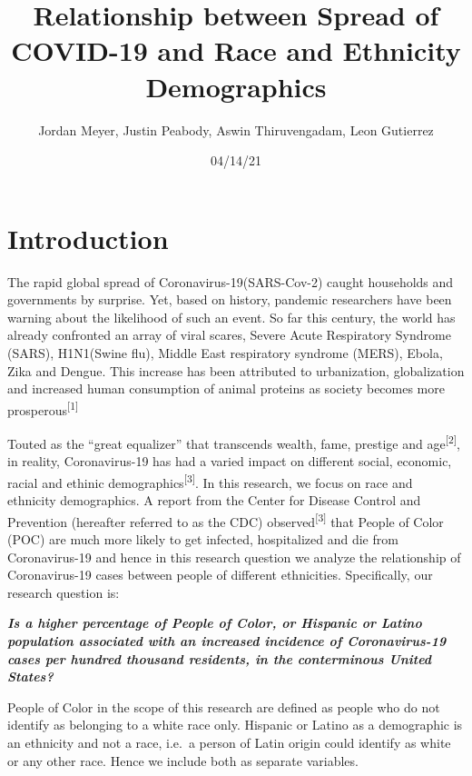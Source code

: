 \documentclass[
]{article}
\title{Relationship between Spread of COVID-19 and Race and Ethnicity
Demographics}
\author{Jordan Meyer, Justin Peabody, Aswin Thiruvengadam, Leon Gutierrez}
\date{04/14/21}
\begin{document}
\maketitle

{
\setcounter{tocdepth}{2}
\tableofcontents
}
\newpage

\newpage
\setlength{\headsep}{1cm}
\maketitle

\newpage
\setlength{\headsep}{1cm}

\section{Introduction}

The rapid global spread of Coronavirus-19(SARS-Cov-2) caught households
and governments by surprise. Yet, based on history, pandemic researchers
have been warning about the likelihood of such an event. So far this
century, the world has already confronted an array of viral scares,
Severe Acute Respiratory Syndrome (SARS), H1N1(Swine flu), Middle East
respiratory syndrome (MERS), Ebola, Zika and Dengue. This increase has
been attributed to urbanization, globalization and increased human
consumption of animal proteins as society becomes more
prosperous\textsuperscript{{[}1{]}}

Touted as the ``great equalizer'' that transcends wealth, fame, prestige
and age\textsuperscript{{[}2{]}}, in reality, Coronavirus-19 has had a
varied impact on different social, economic, racial and ethinic
demographics\textsuperscript{{[}3{]}}. In this research, we focus on
race and ethnicity demographics. A report from the Center for Disease
Control and Prevention (hereafter referred to as the CDC)
observed\textsuperscript{{[}3{]}} that People of Color (POC) are much
more likely to get infected, hospitalized and die from Coronavirus-19
and hence in this research question we analyze the relationship of
Coronavirus-19 cases between people of different ethnicities.
Specifically, our research question is:

\textbf{\emph{Is a higher percentage of People of Color, or Hispanic or
Latino population associated with an increased incidence of
Coronavirus-19 cases per hundred thousand residents, in the conterminous
United States?}}

People of Color in the scope of this research are defined as people who
do not identify as belonging to a white race only. Hispanic or Latino as
a demographic is an ethnicity and not a race, i.e.~a person of Latin
origin could identify as white or any other race. Hence we include both
as separate variables.
\end{document}
